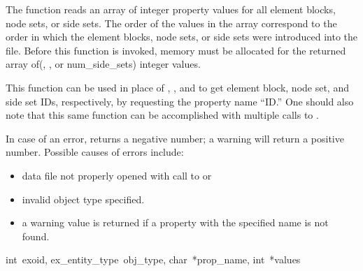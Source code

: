 The function  reads an array of integer
property values for all element blocks, node sets, or side sets. The
order of the values in the array correspond to the order in which the
element blocks, node sets, or side sets were introduced into the
file. Before this function is invoked, memory must be allocated for
the returned array of(, , or
{num_side_sets}) integer values.


This function can be used in place of
, 
, and 
to get element block, node set, and side set IDs, respectively, by
requesting the property name ``ID.'' One should also note that this
same function can be accomplished with multiple calls to
.

In case of an error,  returns a negative
number; a warning will return a positive number.  Possible causes of
errors include:


\begin{itemize}
 \item data file not properly opened with call to 
 or 

 \item invalid object type specified.

 \item a warning value is returned if a property with the specified
 name is not found.
\end{itemize}


{int~exoid, 
ex_entity_type~obj_type, 
char~*prop_name, 
int~*values}

